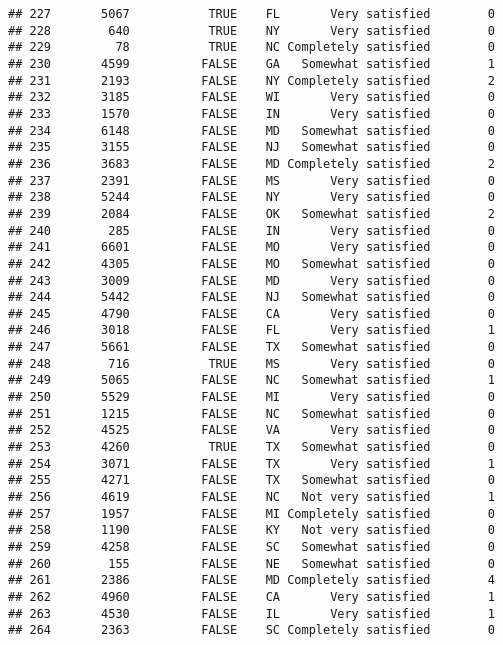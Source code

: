 \documentclass[]{book}
\theoremstyle{definition}
\theoremstyle{definition}
\theoremstyle{remark}
\begin{document}
\begin{verbatim}
## 227       5067           TRUE    FL       Very satisfied        0
## 228        640           TRUE    NY       Very satisfied        0
## 229         78           TRUE    NC Completely satisfied        0
## 230       4599          FALSE    GA   Somewhat satisfied        1
## 231       2193          FALSE    NY Completely satisfied        2
## 232       3185          FALSE    WI       Very satisfied        0
## 233       1570          FALSE    IN       Very satisfied        0
## 234       6148          FALSE    MD   Somewhat satisfied        0
## 235       3155          FALSE    NJ   Somewhat satisfied        0
## 236       3683          FALSE    MD Completely satisfied        2
## 237       2391          FALSE    MS       Very satisfied        0
## 238       5244          FALSE    NY       Very satisfied        0
## 239       2084          FALSE    OK   Somewhat satisfied        2
## 240        285          FALSE    IN       Very satisfied        0
## 241       6601          FALSE    MO       Very satisfied        0
## 242       4305          FALSE    MO   Somewhat satisfied        0
## 243       3009          FALSE    MD       Very satisfied        0
## 244       5442          FALSE    NJ   Somewhat satisfied        0
## 245       4790          FALSE    CA       Very satisfied        0
## 246       3018          FALSE    FL       Very satisfied        1
## 247       5661          FALSE    TX   Somewhat satisfied        0
## 248        716           TRUE    MS       Very satisfied        0
## 249       5065          FALSE    NC   Somewhat satisfied        1
## 250       5529          FALSE    MI       Very satisfied        0
## 251       1215          FALSE    NC   Somewhat satisfied        0
## 252       4525          FALSE    VA       Very satisfied        0
## 253       4260           TRUE    TX   Somewhat satisfied        0
## 254       3071          FALSE    TX       Very satisfied        1
## 255       4271          FALSE    TX   Somewhat satisfied        0
## 256       4619          FALSE    NC   Not very satisfied        1
## 257       1957          FALSE    MI Completely satisfied        0
## 258       1190          FALSE    KY   Not very satisfied        0
## 259       4258          FALSE    SC   Somewhat satisfied        0
## 260        155          FALSE    NE   Somewhat satisfied        0
## 261       2386          FALSE    MD Completely satisfied        4
## 262       4960          FALSE    CA       Very satisfied        1
## 263       4530          FALSE    IL       Very satisfied        1
## 264       2363          FALSE    SC Completely satisfied        0

\end{verbatim}
\end{document}
